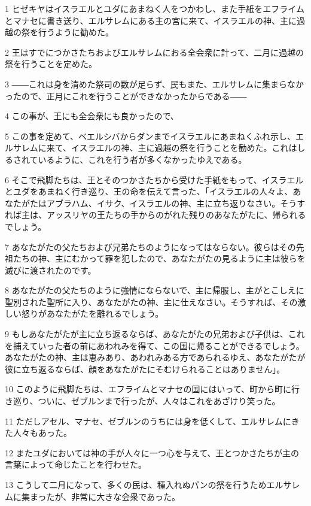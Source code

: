 \par 1 ヒゼキヤはイスラエルとユダにあまねく人をつかわし、また手紙をエフライムとマナセに書き送り、エルサレムにある主の宮に来て、イスラエルの神、主に過越の祭を行うように勧めた。
\par 2 王はすでにつかさたちおよびエルサレムにおる全会衆に計って、二月に過越の祭を行うことを定めた。
\par 3 ――これは身を清めた祭司の数が足らず、民もまた、エルサレムに集まらなかったので、正月にこれを行うことができなかったからである――
\par 4 この事が、王にも全会衆にも良かったので、
\par 5 この事を定めて、ベエルシバからダンまでイスラエルにあまねくふれ示し、エルサレムに来て、イスラエルの神、主に過越の祭を行うことを勧めた。これはしるされているように、これを行う者が多くなかったゆえである。
\par 6 そこで飛脚たちは、王とそのつかさたちから受けた手紙をもって、イスラエルとユダをあまねく行き巡り、王の命を伝えて言った、「イスラエルの人々よ、あなたがたはアブラハム、イサク、イスラエルの神、主に立ち返りなさい。そうすれば主は、アッスリヤの王たちの手からのがれた残りのあなたがたに、帰られるでしょう。
\par 7 あなたがたの父たちおよび兄弟たちのようになってはならない。彼らはその先祖たちの神、主にむかって罪を犯したので、あなたがたの見るように主は彼らを滅びに渡されたのです。
\par 8 あなたがたの父たちのように強情にならないで、主に帰服し、主がとこしえに聖別された聖所に入り、あなたがたの神、主に仕えなさい。そうすれば、その激しい怒りがあなたがたを離れるでしょう。
\par 9 もしあなたがたが主に立ち返るならば、あなたがたの兄弟および子供は、これを捕えていった者の前にあわれみを得て、この国に帰ることができるでしょう。あなたがたの神、主は恵みあり、あわれみある方であられるゆえ、あなたがたが彼に立ち返るならば、顔をあなたがたにそむけられることはありません」。
\par 10 このように飛脚たちは、エフライムとマナセの国にはいって、町から町に行き巡り、ついに、ゼブルンまで行ったが、人々はこれをあざけり笑った。
\par 11 ただしアセル、マナセ、ゼブルンのうちには身を低くして、エルサレムにきた人々もあった。
\par 12 またユダにおいては神の手が人々に一つ心を与えて、王とつかさたちが主の言葉によって命じたことを行わせた。
\par 13 こうして二月になって、多くの民は、種入れぬパンの祭を行うためエルサレムに集まったが、非常に大きな会衆であった。
